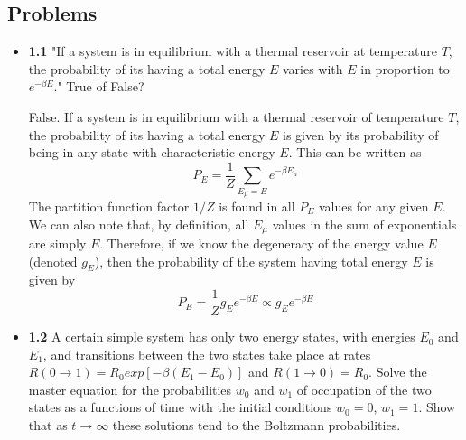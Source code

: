 \documentclass{article}
\begin{document}
\subsection{Problems}
\begin{itemize}
\item \textbf{1.1} "If a system is in equilibrium with a thermal reservoir at temperature $T$, the probability
of its having a total energy $E$ varies with $E$ in proportion to $e^{-\beta E}.$" True of False?

{\color{red} False. If a system is in equilibrium with a thermal reservoir of temperature $T$, the
probability of its having a total energy $E$ is given by its probability of being in any state with characteristic
energy $E$. This can be written as
$$P_{E} = \frac{1}{Z}\sum_{E_{\mu} = E}e^{-\beta E_{\mu}}$$
The partition function factor $1/Z$ is found in all $P_{E}$ values for any given $E$. We can also note that,
by definition, all $E_{\mu}$ values in the sum of exponentials are simply $E$. Therefore, if we know the degeneracy
of the energy value $E$ (denoted $g_{E}$), then the probability of the system having total energy $E$ is given by
$$P_{E} = \frac{1}{Z}g_{E}e^{-\beta E} \propto g_{E}e^{-\beta E}$$
}

\item \textbf{1.2} A certain simple system has only two energy states, with energies $E_{0}$ and $E_{1}$, and
transitions between the two states take place at rates $R(0 \rightarrow 1) = R_{0}exp[-\beta (E_{1} - E_{0})]$
and $R(1 \rightarrow 0) = R_{0}$. Solve the master equation for the probabilities $w_{0}$ and $w_{1}$ of
occupation of the two states as a functions of time with the initial conditions $w_{0} = 0$, $w_{1} = 1$.
Show that as $t \rightarrow \infty$ these solutions tend to the Boltzmann probabilities.


\end{itemize}
\end{document}
